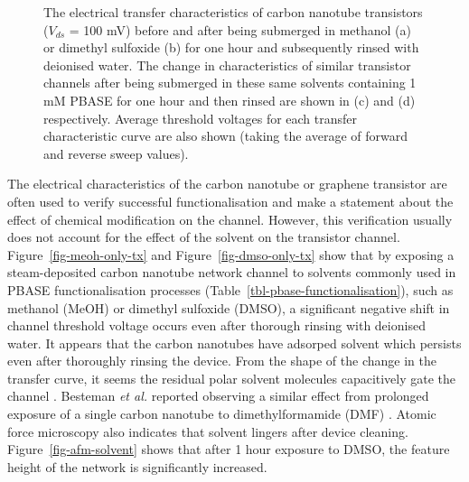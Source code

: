 \documentclass[
  a4paper,
]{scrbook}
\begin{document}
\begin{figure}
\begin{minipage}[t]{0.50\linewidth}
{{}

}

\subcaption{\label{fig-dmso-pbase-tx}}
\end{minipage}%

\caption{\label{fig-PBASE-vs-solvent-only}The electrical transfer
characteristics of carbon nanotube transistors (\(V_{ds}\) = 100 mV)
before and after being submerged in methanol (a) or dimethyl sulfoxide
(b) for one hour and subsequently rinsed with deionised water. The
change in characteristics of similar transistor channels after being
submerged in these same solvents containing 1 mM PBASE for one hour and
then rinsed are shown in (c) and (d) respectively. Average threshold
voltages for each transfer characteristic curve are also shown (taking
the average of forward and reverse sweep values).}

\end{figure}

The electrical characteristics of the carbon nanotube or graphene
transistor are often used to verify successful functionalisation and
make a statement about the effect of chemical modification on the
channel. However, this verification usually does not account for the
effect of the solvent on the transistor channel.
Figure~\ref{fig-meoh-only-tx} and Figure~\ref{fig-dmso-only-tx} show
that by exposing a steam-deposited carbon nanotube network channel to
solvents commonly used in PBASE functionalisation processes
(Table~\ref{tbl-pbase-functionalisation}), such as methanol (MeOH) or
dimethyl sulfoxide (DMSO), a significant negative shift in channel
threshold voltage occurs even after thorough rinsing with deionised
water. It appears that the carbon nanotubes have adsorped solvent which
persists even after thoroughly rinsing the device. From the shape of the
change in the transfer curve, it seems the residual polar solvent
molecules capacitively gate the channel
\autocite{Artyukhin2006,Heller2008}. Besteman \emph{et al.} reported
observing a similar effect from prolonged exposure of a single carbon
nanotube to dimethylformamide (DMF) \autocite{Besteman2003}. Atomic
force microscopy also indicates that solvent lingers after device
cleaning. Figure~\ref{fig-afm-solvent} shows that after 1 hour exposure
to DMSO, the feature height of the network is significantly increased.
\end{document}
